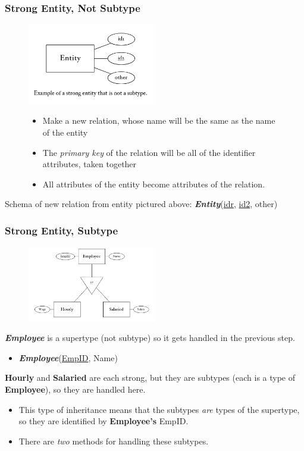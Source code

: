 \documentclass{report}
\begin{document}
\subsubsection{Strong Entity, Not Subtype}
\begin{figure}[H]
\centering
\includegraphics[width=0.5\textwidth]{ ./figures/18.png }
\begin{itemize}
    \item Make a new relation, whose name will be the same as the name of the entity
    \item The \textit{primary key} of the relation will be all of the identifier attributes, taken together
    \item All attributes of the entity become attributes of the relation.
\end{itemize}
\end{figure}
Schema of new relation from entity pictured above: \textit{\textbf{Entity}}(\underline{idr}, \underline{id2}, other)
\subsubsection{Strong Entity, Subtype}
\begin{figure}[H]
\centering
\includegraphics[width=0.5\textwidth]{ ./figures/21.png }
\end{figure}

\textit{\textbf{Employee}} is a supertype (not subtype) so it gets handled in the previous step.
\begin{itemize}
    \item \textit{\textbf{Employee}}(\underline{EmpID}, Name)
\end{itemize}
\textbf{Hourly} and \textbf{Salaried} are each strong, but they are subtypes (each is a type of \textbf{Employee}), so they are handled here.
\begin{itemize}
    \item This type of inheritance means that the subtypes \textit{are} types of the supertype, so they are identified by \textbf{Employee's} EmpID.
    \item There are \textit{two} methods for handling these subtypes.
\end{itemize}
\end{document}
